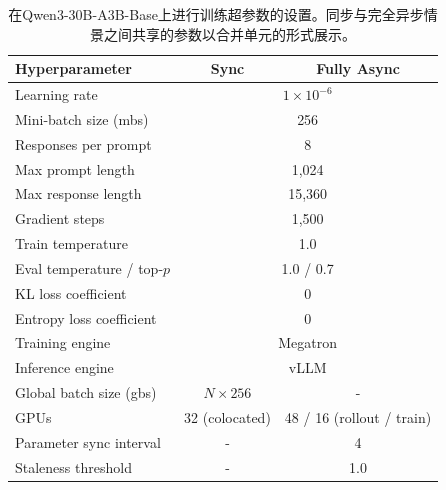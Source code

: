 \documentclass{article}
\theoremstyle{plain}
\theoremstyle{definition}
\theoremstyle{remark}
\begin{document}
\begin{table}[h]
  \caption{在Qwen3-30B-A3B-Base上进行训练超参数的设置。同步与完全异步情景之间共享的参数以合并单元的形式展示。}
  \label{tab:hyperparams}
  \centering
  \setlength{\tabcolsep}{5pt}
  \begin{tabular}{@{}l|c|c@{}}
    \toprule
    \textbf{Hyperparameter}    & \textbf{Sync}                          & \textbf{Fully Async}      \\
    \midrule
    Learning rate              & \multicolumn{2}{c}{$1 \times 10^{-6}$}                             \\
    Mini-batch size (mbs)      & \multicolumn{2}{c}{256}                                            \\
    Responses per prompt       & \multicolumn{2}{c}{8}                                              \\
    Max prompt length          & \multicolumn{2}{c}{1,024}                                          \\
    Max response length        & \multicolumn{2}{c}{15,360}                                         \\
    Gradient steps             & \multicolumn{2}{c}{1,500}                                          \\
    Train temperature          & \multicolumn{2}{c}{1.0}                                            \\
    Eval temperature / top-$p$ & \multicolumn{2}{c}{1.0 / 0.7}                                      \\
    KL loss coefficient        & \multicolumn{2}{c}{0}                                              \\
    Entropy loss coefficient   & \multicolumn{2}{c}{0}                                              \\
    Training engine            & \multicolumn{2}{c}{Megatron}                                       \\
    Inference engine           & \multicolumn{2}{c}{vLLM}                                           \\
    \midrule
    Global batch size (gbs)    & $N \times 256$                         & -                         \\
    GPUs                       & 32 (colocated)                         & 48 / 16 (rollout / train) \\
    \midrule
    Parameter sync interval    & -                                      & 4                         \\
    Staleness threshold        & -                                      & 1.0                       \\
    \bottomrule
  \end{tabular}
\end{table}
\end{document}
